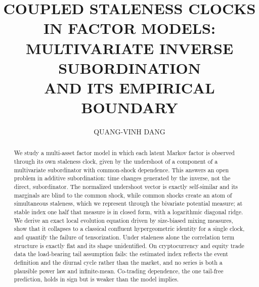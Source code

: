 \documentclass{ws-ijtaf}
\begin{document}

\catchline{}{}{}{}{}

\title{COUPLED STALENESS CLOCKS IN FACTOR MODELS:\\
MULTIVARIATE INVERSE SUBORDINATION\\
AND ITS EMPIRICAL BOUNDARY}

\author{QUANG-VINH DANG}

\address{British University Vietnam, Ecopark Campus\\
Hung Yen, Vietnam\\
}

\maketitle

\begin{history}
\end{history}

\begin{abstract}
We study a multi-asset factor model in which each latent Markov factor is
observed through its own staleness clock, given by the undershoot of a component
of a multivariate subordinator with common-shock dependence. This answers an open
problem in additive subordination: time changes generated by the inverse, not the
direct, subordinator. The normalized undershoot vector is exactly self-similar
and its marginals are blind to the common shock, while common shocks create an
atom of simultaneous staleness, which we represent through the bivariate
potential measure; at stable index one half that measure is in closed form, with
a logarithmic diagonal ridge. We derive an exact local evolution equation driven
by size-biased mixing measures, show that it collapses to a classical confluent
hypergeometric identity for a single clock, and quantify the failure of
tensorization. Under staleness alone the correlation term structure is exactly
flat and its shape unidentified. On cryptocurrency and equity trade data the
load-bearing tail assumption fails: the estimated index reflects the event
definition and the diurnal cycle rather than the market, and no series is both a
plausible power law and infinite-mean. Co-trading dependence, the one tail-free
prediction, holds in sign but is weaker than the model implies.
\end{abstract}
\end{document}
